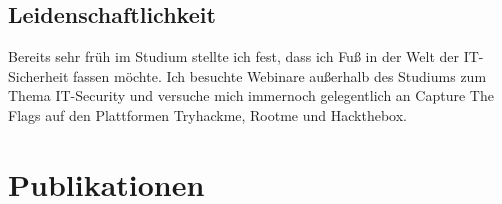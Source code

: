 \documentclass[
	10pt, %
]{FreemanCV}
\begin{document}
\begin{paracol}{2}
\subsection{Leidenschaftlichkeit}

Bereits sehr früh im Studium stellte ich fest, dass ich Fuß in der Welt der IT-Sicherheit fassen möchte. Ich besuchte Webinare außerhalb des Studiums zum Thema IT-Security und versuche mich
immernoch gelegentlich an Capture The Flags auf den Plattformen Tryhackme, Rootme und Hackthebox.


\section{Publikationen}



\medskip %


\medskip %








\end{paracol}
\end{document}
